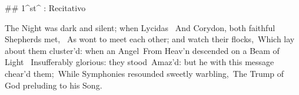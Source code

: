## 1^st^ \mvmt: Recitativo

\beginnumbering
The Night was dark and silent; when Lycidas \ 
And Corydon, both faithful Shepherds met, \ 
As wont to meet each other; and watch their flocks,\ 
Which lay about them cluster’d: when an Angel\ 
From Heav’n descended on a Beam of Light \ 
Insufferably glorious: they stood\ 
Amaz’d: but he with this message chear’d them;\ 
While Symphonies resounded sweetly warbling,\ 
The Trump of God preluding to his Song.\ 
\endnumbering
